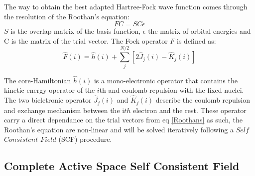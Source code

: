 \documentclass[10pt]{report}
\numberwithin{equation}{section}
\begin{document}
The way to obtain the best adapted Hartree-Fock wave function comes through the resolution of the Roothan's equation:
\begin{equation}\label{Roothans}
    FC=SC\epsilon
\end{equation}
$S$ is the overlap matrix of the basis function, $\epsilon$ the matrix of orbital energies and C is the matrix of the trial vector.
The Fock operator $F$ is defined as:
\begin{equation}
    \hat{F}(i)=\hat{h}(i)+\sum_{j}^{N/2}[2\hat{J}_{j}(i)-\hat{K}_{j}(i)]
\end{equation}

The core-Hamiltonian $\hat{h}(i)$ is a mono-electronic operator that contains the kinetic energy operator of the $i$th and coulomb repulsion with the fixed nuclei. 
The two bieletronic operator $\hat{J}_{j}(i)$ and $\hat{K}_{j}(i)$ describe the coulomb repulsion and exchange mechanism between the i$th$ electron and the rest.
These operator carry a direct dependance on the trial vectors from eq \ref{Roothans} as such, the Roothan's equation are non-linear and will be solved iteratively following a $Self$ $Consistent$ $Field$ (SCF) procedure.


\subsection{Complete Active Space Self Consistent Field}
\end{document}
